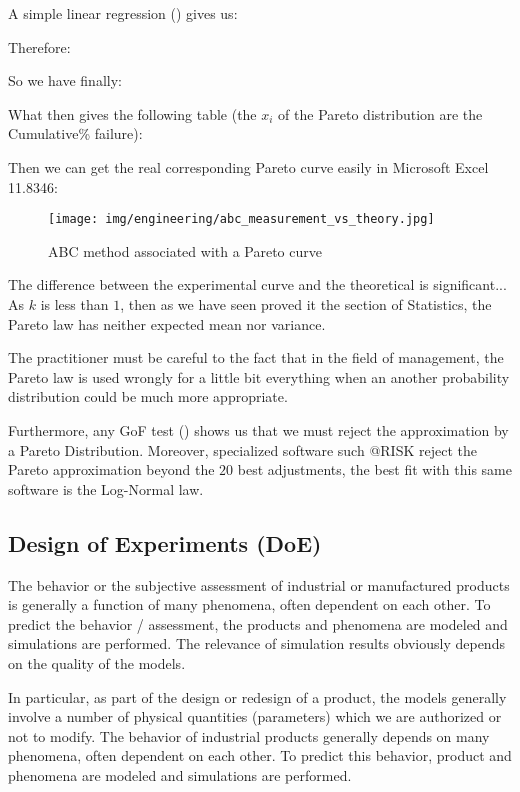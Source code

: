 	A simple linear regression () gives us:
	
	Therefore:
	
	So we have finally:
	
	What then gives the following table (the $x_i$ of the Pareto distribution are the Cumulative\% failure):
	
	Then we can get the real corresponding Pareto curve easily in Microsoft Excel 11.8346:
	\begin{figure}[H]
		\begin{center}
		\texttt{[image: img/engineering/abc\_measurement\_vs\_theory.jpg]}
		\end{center}	
		\caption{ABC method associated with a Pareto curve}
	\end{figure}
	The difference between the experimental curve and the theoretical is significant... As $k$ is less than $1$, then as we have seen proved it the section of Statistics, the Pareto law has neither expected mean nor variance.
	
	The practitioner must be careful to the fact that in the field of management, the Pareto law is used wrongly for a little bit everything when an another probability distribution could be much more appropriate.
	
	Furthermore, any GoF test () shows us that we must reject the approximation by a Pareto Distribution. Moreover, specialized software such @RISK reject the Pareto approximation beyond the $20$ best adjustments, the best fit with this same software is the Log-Normal law.
	
	\pagebreak
	\subsection{Design of Experiments (DoE)}
	The behavior or the subjective assessment of industrial or manufactured products is generally a function of many phenomena, often dependent on each other. To predict the behavior / assessment, the products and phenomena are modeled and simulations are performed. The relevance of simulation results obviously depends on the quality of the models.
	
	In particular, as part of the design or redesign of a product, the models generally involve a number of physical quantities (parameters) which we are authorized or not to modify. The behavior of industrial products generally depends on many phenomena, often dependent on each other. To predict this behavior, product and phenomena are modeled and simulations are performed.
	
